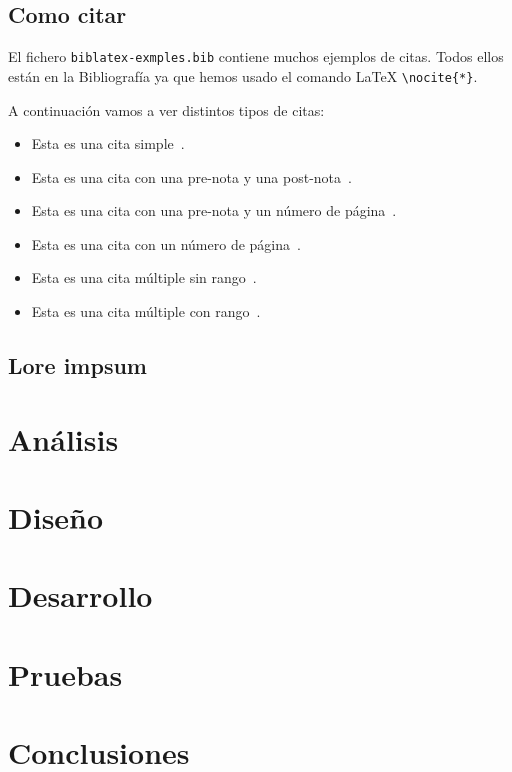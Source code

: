 \documentclass[a4paper,12pt]{report}
\begin{document}
\section{Como citar}

El fichero \texttt{biblatex-exmples.bib} contiene muchos ejemplos de citas. 
Todos ellos están en la Bibliografía ya que hemos usado el comando \LaTeX{} \texttt{\textbackslash{}nocite\{*\}}.

A continuación vamos a ver distintos tipos de citas:
\begin{itemize}
    \item Esta es una cita simple~\cite{westfahl:space}.
    \item Esta es una cita con una pre-nota y una post-nota~\cite[pre-nota][post-nota]{westfahl:space}.
    \item Esta es una cita con una pre-nota y un número de página~\cite[pre-nota][42]{westfahl:space}.
    \item Esta es una cita con un número de página~\cite[][42]{westfahl:space}.
    \item Esta es una cita múltiple sin rango~\cites{westfahl:space, aksin}.
    \item Esta es una cita múltiple con rango~\cites{westfahl:space, angenendt, aksin}.
\end{itemize} 

\section{Lore impsum}
\lipsum[2-4]

\chapter{Análisis}
\lipsum[2-4]

\chapter{Diseño}
\lipsum[2-4]

\chapter{Desarrollo}
\lipsum[2-4]

\chapter{Pruebas}
\lipsum[2-4]

\chapter{Conclusiones}
\lipsum[2-4]
\end{document}
